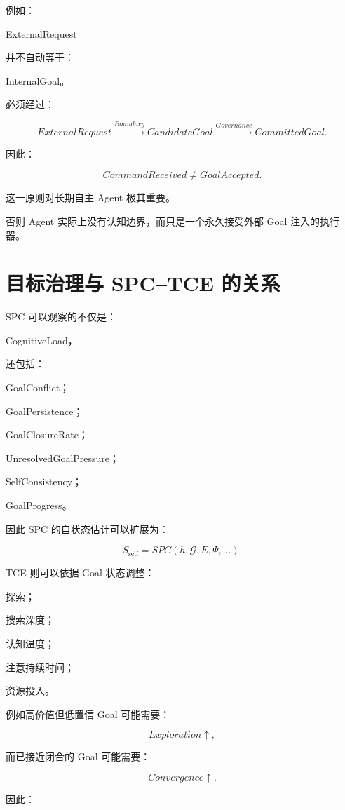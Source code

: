 例如：

ExternalRequest

并不自动等于：

InternalGoal。

必须经过：

\[
ExternalRequest
\xrightarrow{Boundary}
CandidateGoal
\xrightarrow{Governance}
CommittedGoal.
\]

因此：

\[
\boxed{
CommandReceived
\neq
GoalAccepted.
}
\]

这一原则对长期自主 Agent 极其重要。

否则 Agent 实际上没有认知边界，而只是一个永久接受外部 Goal 注入的执行器。


\section{目标治理与 SPC--TCE 的关系}

SPC 可以观察的不仅是：

CognitiveLoad，

还包括：

GoalConflict；

GoalPersistence；

GoalClosureRate；

UnresolvedGoalPressure；

SelfConsistency；

GoalProgress。

因此 SPC 的自状态估计可以扩展为：

\[
S_{\mathrm{self}}
=
SPC(
h,
\mathcal G,
E,
\Psi,
\ldots
).
\]

TCE 则可以依据 Goal 状态调整：

探索；

搜索深度；

认知温度；

注意持续时间；

资源投入。

例如高价值但低置信 Goal 可能需要：

\[
Exploration\uparrow,
\]

而已接近闭合的 Goal 可能需要：

\[
Convergence\uparrow.
\]

因此：

\begin{statementbox}
\centering
{}
\end{statementbox}

